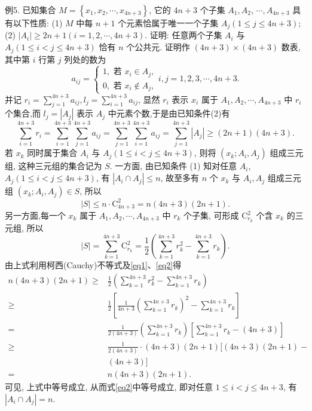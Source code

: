 例5. 已知集合 $M=\left\{x_1, x_2, \cdots, x_{4 n+3}\right\}$, 它的 $4 n+3$ 个子集 $A_1, A_2$, $\cdots, A_{4 n+3}$ 具有以下性质:
(1) $M$ 中每 $n+1$ 个元素恰属于唯一一个子集 $A_j(1 \leqslant j \leqslant 4 n+3)$;
(2) $\left|A_i\right| \geqslant 2 n+1(i=1,2, \cdots, 4 n+3)$.
证明: 任意两个子集 $A_i$ 与 $A_j(1 \leqslant i<j \leqslant 4 n+3)$ 恰有 $n$ 个公共元.
证明作 $(4 n+3) \times(4 n+3)$ 数表, 其中第 $i$ 行第 $j$ 列处的数为
$$
a_{i j}=\left\{\begin{array}{l}
1, \text { 若 } x_i \in A_j, \\
0, \text { 若 } x_i \notin A_j,
\end{array} i, j=1,2,3, \cdots, 4 n+3 .\right.
$$
并记 $r_i=\sum_{j=1}^{4 n+3} a_{i j}, l_j=\sum_{i=1}^{4 n+3} a_{i j}$, 显然 $r_i$ 表示 $x_i$ 属于 $A_1, A_2, \cdots, A_{4 n+3}$ 中 $r_i$ 个集合,而 $l_j=\left|A_j\right|$ 表示 $A_j$ 中元素个数,于是由已知条件(2)有
$$
\sum_{i=1}^{4 n+3} r_i=\sum_{i=1}^{4 n+3} \sum_{j=1}^{4 n+3} a_{i j}=\sum_{j=1}^{4 n+3} \sum_{i=1}^{4 n+3} a_{i j}=\sum_{j=1}^{4 n+3}\left|A_j\right| \geqslant(2 n+1)(4 n+3) . \label{eq1}
$$
若 $x_k$ 同时属于集合 $A_i$ 与 $A_j(1 \leqslant i<j \leqslant 4 n+3)$, 则将 $\left(x_k ; A_i, A_j\right)$ 组成三元组, 这种三元组的集合记为 $S$. 一方面, 由已知条件 (1) 知对任意 $A_i$, $A_j(1 \leqslant i<j \leqslant 4 n+3)$, 有 $\left|A_i \cap A_j\right| \leqslant n$, 故至多有 $n$ 个 $x_k$ 与 $A_i, A_j$ 组成三元组 $\left(x_k ; A_i, A_j\right) \in S$, 所以
$$
|S| \leqslant n \cdot \mathrm{C}_{4 n+3}^2=n(4 n+3)(2 n+1) . \label{eq2}
$$
另一方面,每一个 $x_k$ 属于 $A_1, A_2, \cdots, A_{4 n+3}$ 中 $r_k$ 个子集, 可形成 $\mathrm{C}_{r_k}^2$ 个含 $x_k$ 的三元组, 所以
$$
|S|=\sum_{k=1}^{4 n+3} \mathrm{C}_{r_k}^2=\frac{1}{2}\left(\sum_{k=1}^{4 n+3} r_k^2-\sum_{k=1}^{4 n+3} r_k\right) .
$$
由上式利用柯西(Cauchy)不等式及\ref{eq1}、\ref{eq2}得
$$
\begin{aligned}
n(4 n+3)(2 n+1) \geqslant & \frac{1}{2}\left(\sum_{k=1}^{4 n+3} r_k^2-\sum_{k=1}^{4 n+3} r_k\right) \\
\geqslant & \frac{1}{2}\left[\frac{1}{4 n+3}\left(\sum_{k=1}^{4 n+3} r_k\right)^2-\sum_{k=1}^{4 n+3} r_k\right] \\
= & \frac{1}{2(4 n+3)}\left(\sum_{k=1}^{4 n+3} r_k\right)\left[\sum_{k=1}^{4 n+3} r_k-(4 n+3)\right] \\
\geqslant & \frac{1}{2(4 n+3)} \cdot(4 n+3)(2 n+1)[(4 n+3)(2 n+1)- \\
& (4 n+3)] \\
= & n(4 n+3)(2 n+1) .
\end{aligned}
$$
可见, 上式中等号成立, 从而式\ref{eq2}中等号成立, 即对任意 $1 \leqslant i<j \leqslant 4 n+3$, 有
$\left|A_i \cap A_j\right|=n$.



